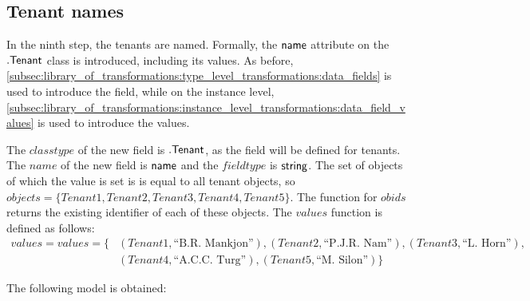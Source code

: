 \subsection{Tenant names}
\label{sec:application:building_the_model:tenant_names}

In the ninth step, the tenants are named. Formally, the $\mathsf{name}$ attribute on the $.\mathsf{Tenant}$ class is introduced, including its values. As before, \cref{subsec:library_of_transformations:type_level_transformations:data_fields} is used to introduce the field, while on the instance level, \cref{subsec:library_of_transformations:instance_level_transformations:data_field_values} is used to introduce the values.

The $classtype$ of the new field is $.\mathsf{Tenant}$, as the field will be defined for tenants. The $name$ of the new field is $\mathsf{name}$ and the $fieldtype$ is $\mathsf{string}$. The set of objects of which the value is set is is equal to all tenant objects, so $objects = \{Tenant1, Tenant2, Tenant3, Tenant4, Tenant5\}$. The function for $obids$ returns the existing identifier of each of these objects. The $values$ function is defined as follows:
\begin{align*}
    values = values = \{&(Tenant1, \text{``B.R. Mankjon''}), (Tenant2, \text{``P.J.R. Nam''}), (Tenant3, \text{``L. Horn''}), \\&(Tenant4, \text{``A.C.C. Turg''}), (Tenant5, \text{``M. Silon''})\}
\end{align*}

The following model is obtained:


